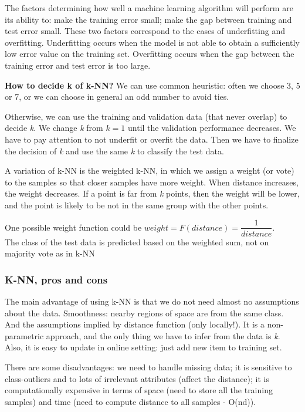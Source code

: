 \documentclass{article}
\begin{document}
\bigskip\bigskip

The factors determining how well a machine learning algorithm will perform are its ability to: make the training error small; make the gap between training and test error small.
These two factors correspond to the cases of underfitting and overfitting.
Underﬁtting occurs when the model is not able to obtain a sufficiently low error value on the training set. Overﬁtting occurs when the gap between the training error and test
error is too large.


\bigskip


\textbf{How to decide k of k-NN?} We can use common heuristic: often we choose 3, 5 or 7, or we can choose in general an odd number to avoid ties.

Otherwise, we can use the training and validation data (that never overlap) to decide \emph{k}. We change \emph{k} from \(k=1\) until the validation performance decreases. We have to pay attention to not underfit or overfit the data. Then we have to finalize the decision of \emph{k} and use the same \emph{k} to classify the test data.

\bigskip

A variation of k-NN is the weighted k-NN, in which we assign a weight (or vote) to the samples so that closer samples have more weight. When distance increases, the weight decreases. If a point is far from \emph{k} points, then the weight will be lower, and the point is likely to be not in the same group with the other points. 

One possible weight function could be \(weight = F(distance) = \dfrac{1}{distance}\). \\

The class of the test data is predicted based on the weighted sum, not on majority vote as in k-NN


\subsubsection*{K-NN, pros and cons}
The main advantage of using k-NN is that we do not need almost no assumptions about the data. Smoothness: nearby regions of space are from the same class. And the assumptions implied by distance function (only locally!). It is a non-parametric approach, and the only thing we have to infer from the data is \emph{k}. Also, it is easy to update in online setting: just add new item to training set.

There are some disadvantages: we need to handle missing data; it is sensitive to class-outliers and to lots of irrelevant attributes (affect the distance); it is computationally expensive in terms of space (need to store all the training samples) and time (need to compute distance to all samples - O(nd)).
\end{document}
